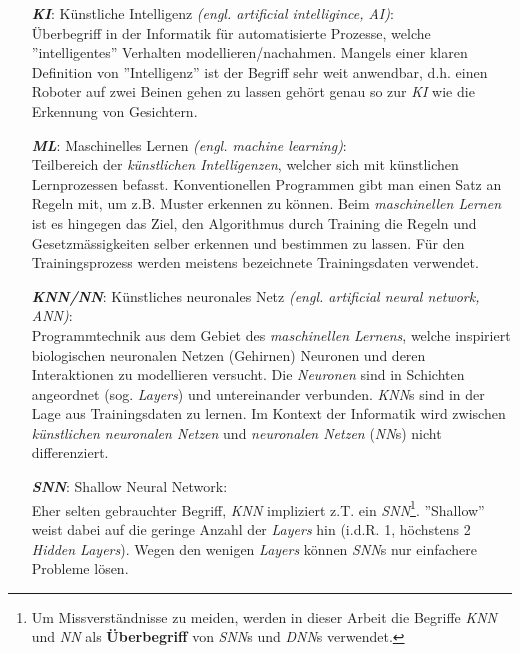\begin{itemize}[leftmargin=2cm]
	\item[\textbf{\textit{KI}}:] Künstliche Intelligenz \textit{(engl. artificial intelligince, AI)}:\\
	 Überbegriff in der Informatik für automatisierte Prozesse, welche ''intelligentes'' Verhalten modellieren/nachahmen. Mangels einer klaren Definition von ''Intelligenz'' ist der Begriff sehr weit anwendbar\cite{ai}, d.h. einen Roboter auf zwei Beinen gehen zu lassen gehört genau so zur \textit{KI} wie die Erkennung von Gesichtern.
	 
	\item[\textbf{\textit{ML}}:] Maschinelles Lernen \textit{(engl. machine learning)}:\\
	Teilbereich der \textit{künstlichen Intelligenzen}, welcher sich mit künstlichen Lernprozessen befasst. Konventionellen Programmen gibt man einen Satz an Regeln mit, um z.B. Muster erkennen zu können. Beim \textit{maschinellen Lernen} ist es hingegen das Ziel, den Algorithmus durch Training die Regeln und Gesetzmässigkeiten selber erkennen und bestimmen zu lassen. Für den Trainingsprozess werden meistens bezeichnete Trainingsdaten verwendet\cite{ml}. 
	
	\item[\textbf{\textit{KNN/NN}}:] Künstliches neuronales Netz \textit{(engl. artificial neural network, ANN)}:\\
	Programmtechnik aus dem Gebiet des \textit{maschinellen Lernens}, welche inspiriert biologischen neuronalen Netzen (Gehirnen) Neuronen und deren Interaktionen zu modellieren versucht. Die \textit{Neuronen} sind in Schichten angeordnet (sog. \textit{Layers}) und untereinander verbunden. \textit{KNN}s sind in der Lage aus Trainingsdaten zu lernen\cite{ann}. Im Kontext der Informatik wird zwischen \textit{künstlichen neuronalen Netzen} und \textit{neuronalen Netzen} (\textit{NN}s) nicht differenziert.
	
	\item[\textbf{\textit{SNN}}:] Shallow Neural Network:\\
	Eher selten gebrauchter Begriff, \textit{KNN} impliziert z.T. ein \textit{SNN}\footnote{Um Missverständnisse zu meiden, werden in dieser Arbeit die Begriffe \textit{KNN} und \textit{NN} als \textbf{Überbegriff} von \textit{SNN}s und \textit{DNN}s verwendet.}. ''Shallow'' weist dabei auf die geringe Anzahl der \textit{Layers} hin (i.d.R. 1, höchstens 2 \textit{Hidden Layers}). Wegen den wenigen \textit{Layers} können \textit{SNN}s nur einfachere Probleme lösen\cite{ann}.
		

\end{itemize}
